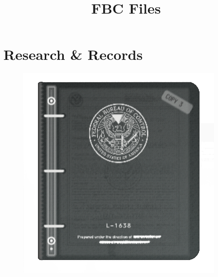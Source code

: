 \documentclass{article}
\title{FBC Files}
\author{}
\begin{document}
	\maketitle
	\raggedright
	\newpage
	
	\section*{\centering Research \& Records}
	\begin{figure}[ht!]
		\centering
		\includegraphics[width=0.7\linewidth]{images/Research}
		\label{fig:research}
	\end{figure}
	
	
	
	
	
	
	
	
	
	
	
	
	
	
	
	
	
	
	
	
	
	
\end{document}
